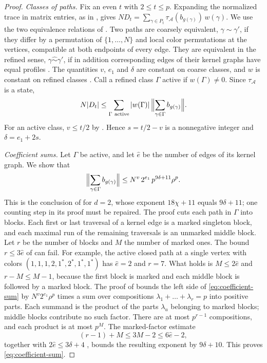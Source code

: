 \documentclass[11pt]{article}
\numberwithin{equation}{section}
\theoremstyle{boldremark}\newtheorem{remark}[theorem]{Remark}
\begin{document}
\begin{proof}
\emph{Classes of paths.}
Fix an even $t$ with $2\le t\le p$. Expanding the normalized trace in
matrix entries, as in \cite[equations~(22)--(23)]{BC}, gives
$N D_t=\sum_{\gamma\in P_t}\tau_{\mathcal A}(b_{g(\gamma)})\,w(\gamma)$.
We use the two equivalence relations of \cite[Section~5.2]{BC}.
Two paths are coarsely equivalent, $\gamma\sim\gamma'$, if they differ
by a permutation of $\{1,\dots,N\}$ and local color permutations at
the vertices, compatible at both endpoints of every edge. They are
equivalent in the refined sense, $\gamma\mathrel{\hat\sim}\gamma'$, if
in addition corresponding edges of their kernel graphs have equal
profiles \cite[Definition~5.6]{BC}. The quantities $v$, $e_1$ and
$\delta$ are constant on coarse classes, and $w$ is constant on
refined classes \cite[Lemma~5.7]{BC}. Call a refined class $\Gamma$
active if $w(\Gamma)\ne0$. Since $\tau_{\mathcal A}$ is a state,
\begin{equation}
 N|D_t|\le\sum_{\Gamma\ \mathrm{active}}|w(\Gamma)|\,
 \Bigl\|\sum_{\gamma\in\Gamma}b_{g(\gamma)}\Bigr\|.
 \label{eq:class-sum}
\end{equation}
For an active class, $v\le t/2$ by \cite[Corollary~5.5]{BC}. Hence
$s=t/2-v$ is a nonnegative integer and $\delta=e_1+2s$.

\emph{Coefficient sums.}
Let $\Gamma$ be active, and let $\hat e$ be the number of edges of its
kernel graph. We show that
\begin{equation}
 \Bigl\|\sum_{\gamma\in\Gamma}b_{g(\gamma)}\Bigr\|
 \le N^v\,2^{e_1}\,p^{9\delta+11}\rho^p .
 \label{eq:coefficient-sum}
\end{equation}
This is the conclusion of \cite[Lemma~5.9]{BC} for $d=2$, whose
exponent $18\chi+11$ equals $9\delta+11$; one counting step in its
proof must be repaired. The proof cuts each path in $\Gamma$ into
blocks. Each first or last traversal of a kernel edge is a marked
singleton block, and each maximal run of the remaining traversals is
an unmarked middle block. Let $r$ be the number of blocks and $M$ the
number of marked ones. The bound $r\le3\hat e$ of
\cite[equation~(31)]{BC} can fail. For example, the active closed path
at a single vertex with colors $(1,1,1,2,1^*,2^*,1^*,1^*)$ has
$\hat e=2$ and $r=7$. What holds is $M\le2\hat e$ and $r-M\le M-1$,
because the first block is marked and each middle block is followed by
a marked block. The proof of \cite[Lemma~5.9]{BC} bounds the left side
of \eqref{eq:coefficient-sum} by $N^v2^{e_1}\rho^p$ times a sum over
compositions $\lambda_1+\dots+\lambda_r=p$ into positive parts. Each
summand is the product of the parts $\lambda_u$ belonging to marked
blocks; middle blocks contribute no such factor. There are at most
$p^{r-1}$ compositions, and each product is at most $p^M$. The
marked-factor estimate
\[
 (r-1)+M\le3M-2\le6\hat e-2,
\]
together with $2\hat e\le3\delta+4$ \cite[equation~(29)]{BC}, bounds
the resulting exponent by $9\delta+10$. This proves
\eqref{eq:coefficient-sum}.


\end{proof}
\end{document}

